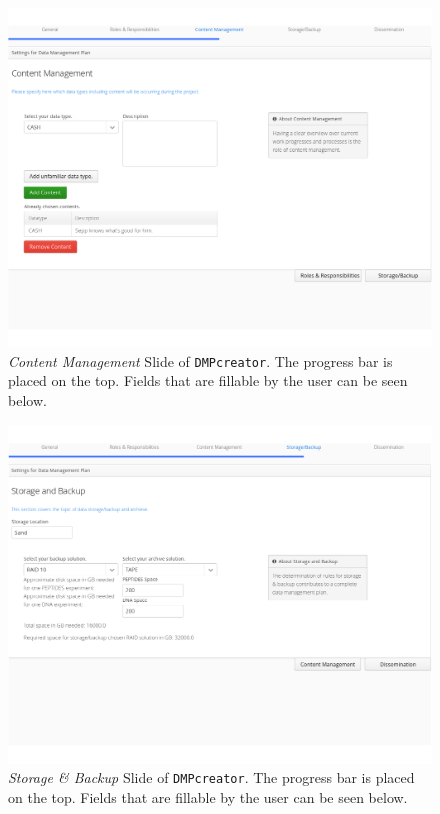 \begin{landscape}
\begin{figure}[]
	\centering
	\includegraphics[width=1.2\textwidth]{pictures/ContentManagement.png}
	\caption{\textit{Content Management} Slide of \texttt{DMPcreator}. The progress bar is placed on the top. Fields that are fillable by the user can be seen below.}
	\label{ContentManagementSlide}
\end{figure}

\begin{figure}[]
	\centering
	\includegraphics[width=1.2\textwidth]{pictures/StorageBackup.png}
	\caption{\textit{Storage \& Backup} Slide of \texttt{DMPcreator}. The progress bar is placed on the top. Fields that are fillable by the user can be seen below.}
		\label{StorageBackupSlide}
\end{figure}


\end{landscape}
